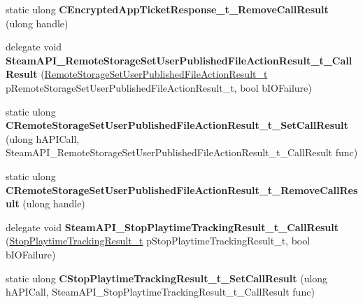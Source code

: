 \begin{DoxyCompactItemize}
\mbox{\label{class_valve_1_1_interop_1_1_native_entrypoints_aba73d0bf5a777ccabfc6e3427468b3bb}} 
static ulong {\bfseries C\+Encrypted\+App\+Ticket\+Response\+\_\+t\+\_\+\+Remove\+Call\+Result} (ulong handle)
\item 
\mbox{\label{class_valve_1_1_interop_1_1_native_entrypoints_a2913286069495b0d54c3d540490dd22c}} 
delegate void {\bfseries Steam\+A\+P\+I\+\_\+\+Remote\+Storage\+Set\+User\+Published\+File\+Action\+Result\+\_\+t\+\_\+\+Call\+Result} (\hyperlink{struct_valve_1_1_steamworks_1_1_remote_storage_set_user_published_file_action_result__t}{Remote\+Storage\+Set\+User\+Published\+File\+Action\+Result\+\_\+t} p\+Remote\+Storage\+Set\+User\+Published\+File\+Action\+Result\+\_\+t, bool b\+I\+O\+Failure)
\item 
\mbox{\label{class_valve_1_1_interop_1_1_native_entrypoints_a692603a06aad94153511db961b474a49}} 
static ulong {\bfseries C\+Remote\+Storage\+Set\+User\+Published\+File\+Action\+Result\+\_\+t\+\_\+\+Set\+Call\+Result} (ulong h\+A\+P\+I\+Call, Steam\+A\+P\+I\+\_\+\+Remote\+Storage\+Set\+User\+Published\+File\+Action\+Result\+\_\+t\+\_\+\+Call\+Result func)
\item 
\mbox{\label{class_valve_1_1_interop_1_1_native_entrypoints_ae5c4df49814e003f87a7b7c2ec0553a2}} 
static ulong {\bfseries C\+Remote\+Storage\+Set\+User\+Published\+File\+Action\+Result\+\_\+t\+\_\+\+Remove\+Call\+Result} (ulong handle)
\item 
\mbox{\label{class_valve_1_1_interop_1_1_native_entrypoints_aaab187506c34ab02b2823daef85e3e7f}} 
delegate void {\bfseries Steam\+A\+P\+I\+\_\+\+Stop\+Playtime\+Tracking\+Result\+\_\+t\+\_\+\+Call\+Result} (\hyperlink{struct_valve_1_1_steamworks_1_1_stop_playtime_tracking_result__t}{Stop\+Playtime\+Tracking\+Result\+\_\+t} p\+Stop\+Playtime\+Tracking\+Result\+\_\+t, bool b\+I\+O\+Failure)
\item 
\mbox{\label{class_valve_1_1_interop_1_1_native_entrypoints_a4858646111635ce7c0233b29b800ffbd}} 
static ulong {\bfseries C\+Stop\+Playtime\+Tracking\+Result\+\_\+t\+\_\+\+Set\+Call\+Result} (ulong h\+A\+P\+I\+Call, Steam\+A\+P\+I\+\_\+\+Stop\+Playtime\+Tracking\+Result\+\_\+t\+\_\+\+Call\+Result func)

\end{DoxyCompactItemize}

